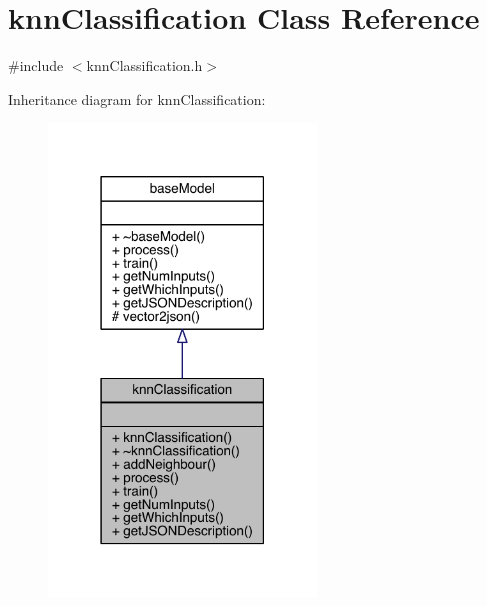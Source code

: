 \hypertarget{classknn_classification}{}\section{knn\+Classification Class Reference}
\label{classknn_classification}


{\ttfamily \#include $<$knn\+Classification.\+h$>$}



Inheritance diagram for knn\+Classification\+:\nopagebreak
\begin{figure}[H]
\begin{center}
\leavevmode
\includegraphics[width=202pt]{classknn_classification__inherit__graph}
\end{center}
\end{figure}


